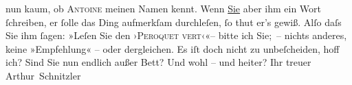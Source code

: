 \begin{ledgroupsized}[t]{13cm}
                    nun kaum, ob \textsc{Antoine} meinen Namen kennt. Wenn \uline{Sie} aber
                    ihm ein {\pb}Wort ſchreiben, er ſolle das
                    Ding aufmerkſam durchleſen, ſo thut er’s gewiß. Alſo daſs Sie ihm ſagen: »Leſen
                    Sie den ›\textsc{Peroquet vert}‹«– bitte ich Sie; – nichts anderes, keine »Empfehlung« – oder
                    dergleichen.\pend
           \pstart
           Es iſt doch nicht zu unbeſcheiden, hoff ich?\pend
           \pstart
           Sind Sie nun endlich außer Bett? Und wohl – und heiter? Ihr treuer \spacefill\mbox{Arthur
                        Schnitzler}\pend
           
         
         \endnumbering{}\end{ledgroupsized}  \newcommand{\dateiname}{L00923}\newcommand{\titel}{Arthur Schnitzler an Georg Brandes, 8. 6. 1899}\newcommand{\editorInnen}{Martin Anton Müller und Gerd-Hermann Susen}
      